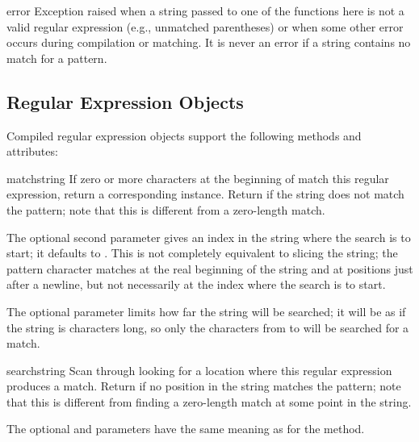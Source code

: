 \begin{excdesc}{error}
  Exception raised when a string passed to one of the functions here
  is not a valid regular expression (e.g., unmatched parentheses) or
  when some other error occurs during compilation or matching.  It is
  never an error if a string contains no match for a pattern.
\end{excdesc}


\subsection{Regular Expression Objects}
\label{re-objects}

Compiled regular expression objects support the following methods and
attributes:

\begin{methoddesc}[RegexObject]{match}{string}
  If zero or more characters at the beginning of  match
  this regular expression, return a corresponding
   instance.  Return  if the string does not
  match the pattern; note that this is different from a zero-length
  match.
  
  The optional second parameter  gives an index in the string
  where the search is to start; it defaults to .  This is not
  completely equivalent to slicing the string; the  pattern
  character matches at the real beginning of the string and at positions
  just after a newline, but not necessarily at the index where the search
  is to start.

  The optional parameter  limits how far the string will
  be searched; it will be as if the string is  characters
  long, so only the characters from  to  will be
  searched for a match.
\end{methoddesc}

\begin{methoddesc}[RegexObject]{search}{string}
  Scan through  looking for a location where this regular
  expression produces a match.  Return  if no
  position in the string matches the pattern; note that this is
  different from finding a zero-length match at some point in the string.
  
  The optional  and  parameters have the same
  meaning as for the  method.
\end{methoddesc}

